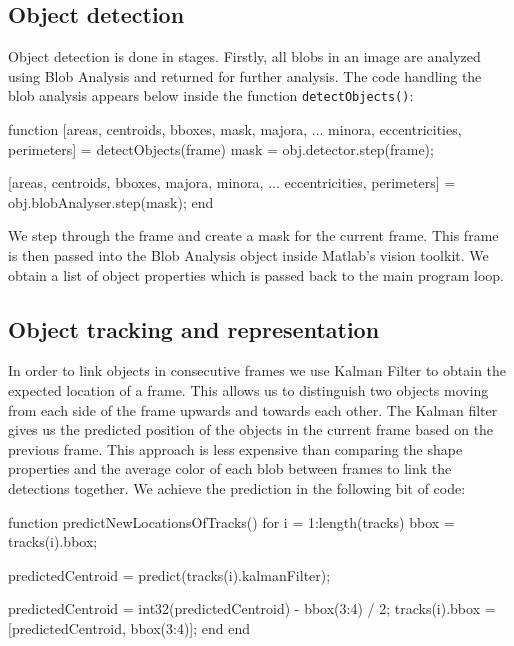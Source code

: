 \documentclass[10pt,a4paper]{article}
\begin{document}
\subsection{Object detection}
	
Object detection is done in stages. Firstly, all blobs in an image are analyzed using Blob Analysis and returned for further analysis. The code handling the blob analysis appears below inside the function \texttt{detectObjects()}:

\begin{verbatimtab}
function [areas, centroids, bboxes, mask, majora, ...
          minora, eccentricities, perimeters] = detectObjects(frame)
        mask = obj.detector.step(frame);

        [areas, centroids, bboxes, majora, minora, ...
        eccentricities, perimeters] = obj.blobAnalyser.step(mask);
    end
\end{verbatimtab}

We step through the frame and create a mask for the current frame. This frame is then passed into the Blob Analysis object inside Matlab's vision toolkit. We obtain a list of object properties which is passed back to the main program loop. 

\subsection{Object tracking and representation}

In order to link objects in consecutive frames we use Kalman Filter to obtain the expected location of a frame. This allows us to distinguish two objects moving from each side of the frame upwards and towards each other. The Kalman filter gives us the predicted position of the objects in the current frame based on the previous frame. This approach is less expensive than comparing the shape properties and the average color of each blob between frames to link the detections together. We achieve the prediction in the following bit of code:

\begin{samepage}
\begin{verbatimtab}
function predictNewLocationsOfTracks()
	for i = 1:length(tracks)
		bbox = tracks(i).bbox;

		predictedCentroid = predict(tracks(i).kalmanFilter);

		predictedCentroid = int32(predictedCentroid) - bbox(3:4) / 2;
		tracks(i).bbox = [predictedCentroid, bbox(3:4)];
	end
end
\end{verbatimtab}
\end{samepage}
\end{document}
